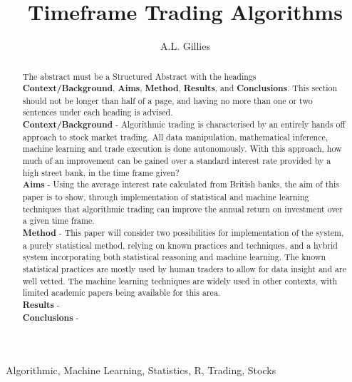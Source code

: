 \documentclass[12pt,a4paper]{article}
\title{Timeframe Trading Algorithms}
\author{A.L. Gillies}
\date{}
\begin{document}
\maketitle

\begin{abstract}
The abstract must be a Structured Abstract with the headings {\bf Context/Background}, {\bf Aims}, {\bf Method}, {\bf Results}, and {\bf Conclusions}.  This section should not be longer than half of a page, and having no more than one or two sentences under each heading is advised.\\

{\bf Context/Background} - Algorithmic trading is characterised by an entirely hands off approach to stock market trading. All data manipulation, mathematical inference, machine learning and trade execution is done autonomously. With this approach, how much of an improvement can be gained over a standard interest rate provided by a high street bank, in the time frame given?\\

{\bf Aims} - Using the average interest rate calculated from British banks, the aim of this paper is to show, through implementation of statistical and machine learning techniques that algorithmic trading can improve the annual return on investment over a given time frame.\\

{\bf Method} - This paper will consider two possibilities for implementation of the system, a purely statistical method, relying on known practices and techniques, and a hybrid system incorporating both statistical reasoning and machine learning. The known statistical practices are mostly used by human traders to allow for data insight and are well vetted. The machine learning techniques are widely used in other contexts, with limited academic papers being available for this area.\\

{\bf Results} - \\

{\bf Conclusions} - \\
\end{abstract}

\begin{keywords}
Algorithmic, Machine Learning, Statistics, R, Trading, Stocks
\end{keywords}

\iffalse
#################################################################################
\fi
\end{document}
